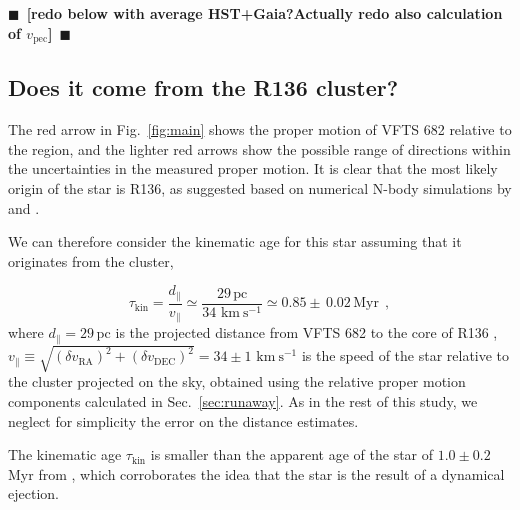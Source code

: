 \documentclass[apjl,twocolumn]{emulateapj}
\newcommand{\todo}[1]{{\large $\blacksquare$~\textbf{\color{red}[#1]}}~$\blacksquare$}
\newcommand{\kms}{{\,\mathrm{km\ s^{-1}}}}
\DeclareRobustCommand{\Figref}[1]{Fig.~\ref{#1}}
\DeclareRobustCommand{\Secref}[1]{Sec.~\ref{#1}}
\begin{document}

\todo{redo below with average HST+Gaia?Actually redo also calculation
  of $v_\mathrm{pec}$}
\subsection{Does it come from the R136 cluster?}
\label{sec:r136_origin}

The red arrow in \Figref{fig:main} shows the proper motion of VFTS 682
relative to the region, and the lighter red arrows show the possible
range of directions within the uncertainties in the measured proper
motion. It is clear that the most likely origin of the star is R136,
as suggested based on numerical N-body simulations by \cite{fujii:11}
and \cite{banerjee:12}.

We can therefore consider the kinematic age for this star assuming
that it originates from the cluster,

\begin{equation}
  \label{eq:kin_age}
  \tau_\mathrm{kin} = \frac{d_\parallel}{v_\parallel} \simeq
  \frac{29\,\mathrm{pc}}{34\,\kms} \simeq 0.85\pm\,0.02\, \mathrm{Myr} \ \ ,
\end{equation}
where $d_\parallel =29$\,pc is the projected distance from VFTS 682 to
the core of R136 \citep[][]{bestenlehner:11}, $v_\parallel \equiv \sqrt{\left(\delta v_\mathrm{RA}\right)^2
    +\left(\delta v_\mathrm{DEC}\right)^2} =34\pm
1\,\kms$ is the speed of the star relative to the cluster projected on the sky, obtained
using the relative proper motion components calculated in
\Secref{sec:runaway}.%
As in the rest of this study, we neglect for
simplicity the error on the distance estimates.

The kinematic age $\tau_\mathrm{kin}$ is smaller than the apparent age
of the star of $1.0\pm 0.2$\,Myr from \cite{schneider:18}, which
corroborates the idea that the star is the result of a dynamical
ejection. 
\end{document}
